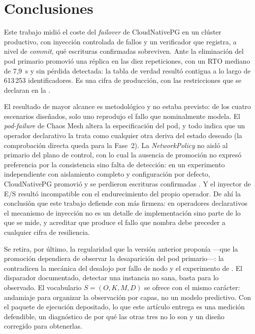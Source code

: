 \section{Conclusiones}\label{sec:concl}
Este trabajo midió el coste del \textit{failover} de CloudNativePG en un clúster productivo, con inyección controlada de fallos y un verificador que registra, a nivel de \textit{commit}, qué escrituras confirmadas sobreviven. Ante la eliminación del pod primario promovió una réplica en las diez repeticiones, con un RTO mediano de 7,9~s y sin pérdida detectada: la tabla de verdad resultó contigua a lo largo de 613\,253 identificadores. Es una cifra de producción, con las restricciones que se declaran en la .

El resultado de mayor alcance es metodológico y no estaba previsto: de los cuatro escenarios diseñados, solo uno reprodujo el fallo que nominalmente modela. El \textit{pod-failure} de Chaos Mesh altera la especificación del pod, y todo indica que un operador declarativo la trata como cualquier otra deriva del estado deseado (la comprobación directa queda para la Fase~2). La \textit{NetworkPolicy} no aisló al primario del plano de control, con lo cual la ausencia de promoción no expresó preferencia por la consistencia sino falta de detección: en un experimento independiente con aislamiento completo y configuración por defecto, CloudNativePG promovió y se perdieron escrituras confirmadas \citep{sivko2026}. Y el inyector de E/S resultó incompatible con el endurecimiento del propio operador. De ahí la conclusión que este trabajo defiende con más firmeza: en operadores declarativos el mecanismo de inyección no es un detalle de implementación sino parte de lo que se mide, y acreditar que produce el fallo que nombra debe preceder a cualquier cifra de resiliencia.

Se retira, por último, la regularidad que la versión anterior proponía —que la promoción dependiera de observar la desaparición del pod primario—: la contradicen la mecánica del desalojo por fallo de nodo y el experimento de \citet{sivko2026}. El disparador documentado, detectar una instancia no sana, basta para lo observado. El vocabulario $S=(O,K,M,D)$ se ofrece con el mismo carácter: andamiaje para organizar la observación por capas, no un modelo predictivo. Con el paquete de ejecución depositado, lo que este artículo entrega es una medición defendible, un diagnóstico de por qué las otras tres no lo son y un diseño corregido para obtenerlas.
